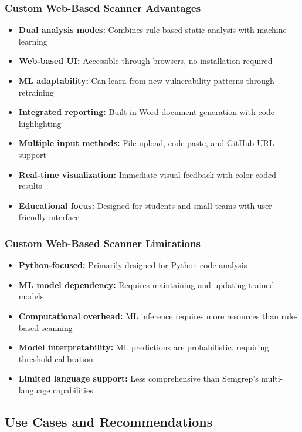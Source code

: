 \subsubsection{Custom Web-Based Scanner Advantages}
\label{sec:custom_scanner_advantages}

\begin{itemize}
	\item \textbf{Dual analysis modes:} Combines rule-based static analysis with machine learning
	\item \textbf{Web-based UI:} Accessible through browsers, no installation required
	\item \textbf{ML adaptability:} Can learn from new vulnerability patterns through retraining
	\item \textbf{Integrated reporting:} Built-in Word document generation with code highlighting
	\item \textbf{Multiple input methods:} File upload, code paste, and GitHub URL support
	\item \textbf{Real-time visualization:} Immediate visual feedback with color-coded results
	\item \textbf{Educational focus:} Designed for students and small teams with user-friendly interface
\end{itemize}

\subsubsection{Custom Web-Based Scanner Limitations}
\label{sec:custom_scanner_limitations}

\begin{itemize}
	\item \textbf{Python-focused:} Primarily designed for Python code analysis
	\item \textbf{ML model dependency:} Requires maintaining and updating trained models
	\item \textbf{Computational overhead:} ML inference requires more resources than rule-based scanning
	\item \textbf{Model interpretability:} ML predictions are probabilistic, requiring threshold calibration
	\item \textbf{Limited language support:} Less comprehensive than Semgrep's multi-language capabilities
\end{itemize}

\subsection{Use Cases and Recommendations}
\label{sec:use_cases_recommendations}

